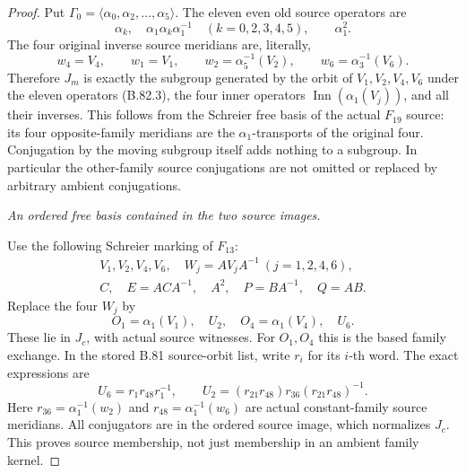\begin{proof}
Put \(\Gamma _0=\langle\alpha _0,\alpha _2,\ldots,\alpha _5\rangle\).
The eleven even old source operators are
\[
 \alpha_k,\quad \alpha_1\alpha_k\alpha_1^{-1}
 \quad(k=0,2,3,4,5),\qquad \alpha_1^2.
 \tag{B.82.3}
\]
The four original inverse source meridians are, literally,
\[
 w_4=V_4,\qquad w_1=V_1,\qquad
 w_2=\alpha_5^{-1}(V_2),\qquad
 w_6=\alpha_3^{-1}(V_6).
 \tag{B.82.4}
\]
Therefore \(J_m\) is exactly the subgroup generated by the orbit of
\(V_1,V_2,V_4,V_6\) under the eleven operators (B.82.3), the four
inner operators \(\operatorname{Inn}(\alpha_1(V_j))\), and all their
inverses. This follows from the Schreier free basis of the actual
\(F_{19}\) source: its four opposite-family meridians are the
\(\alpha _1\)-transports of the original four. Conjugation by the
moving subgroup itself adds nothing to a subgroup. In particular the
other-family source conjugations are not omitted or replaced by
arbitrary ambient conjugations.

\emph{An ordered free basis contained in the two source images.}\par\nopagebreak
Use the following Schreier marking of \(F_{13}\):
\[
 \begin{gathered}
 V_1,V_2,V_4,V_6,\quad W_j=AV_jA^{-1}\ (j=1,2,4,6),\\
 C,\quad E=ACA^{-1},\quad A^2,\quad P=BA^{-1},\quad Q=AB.
 \end{gathered}
 \tag{B.82.5}
\]
Replace the four \(W_j\) by
\[
 O_1=\alpha_1(V_1),\quad U_2,\quad
 O_4=\alpha_1(V_4),\quad U_6.
 \tag{B.82.6}
\]
These lie in \(J_c\), with actual source witnesses. For \(O_1,O_4\)
this is the based family exchange. In the stored B.81 source-orbit list,
write \(r_i\) for its \(i\)-th word. The exact expressions are
\[
 U_6=r_1r_{48}r_1^{-1},\qquad
 U_2=(r_{21}r_{48})r_{36}(r_{21}r_{48})^{-1}.
 \tag{B.82.7}
\]
Here \(r_{36}=\alpha_1^{-1}(w_2)\) and
\(r_{48}=\alpha_1^{-1}(w_6)\) are actual constant-family source
meridians. All conjugators are in the ordered source image, which
normalizes \(J_c\). This proves source membership, not just membership
in an ambient family kernel.


\end{proof}
